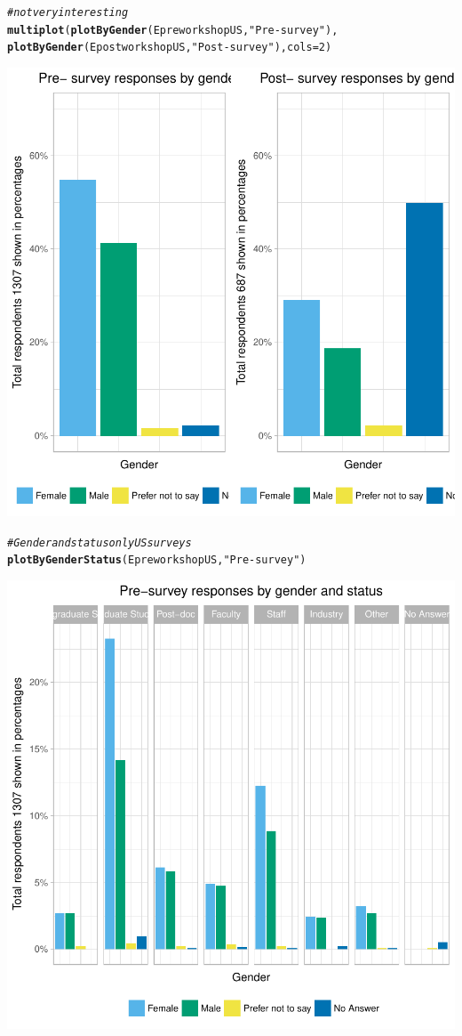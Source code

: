 \documentclass{article}\usepackage[]{graphicx}\usepackage[]{color}
\makeatletter
\newcommand{\hlnum}[1]{\textcolor[rgb]{0.686,0.059,0.569}{#1}}%
\newcommand{\hlstr}[1]{\textcolor[rgb]{0.192,0.494,0.8}{#1}}%
\newcommand{\hlcom}[1]{\textcolor[rgb]{0.678,0.584,0.686}{\textit{#1}}}%
\newcommand{\hlstd}[1]{\textcolor[rgb]{0.345,0.345,0.345}{#1}}%
\newcommand{\hlkwc}[1]{\textcolor[rgb]{0.333,0.667,0.333}{#1}}%
\newcommand{\hlkwd}[1]{\textcolor[rgb]{0.737,0.353,0.396}{\textbf{#1}}}%
\newenvironment{kframe}{%
 \def\at@end@of@kframe{}%
 \ifinner\ifhmode%
  \def\at@end@of@kframe{\end{minipage}}%
  \begin{minipage}{\columnwidth}%
 \fi\fi%
 \def\FrameCommand##1{\hskip\@totalleftmargin \hskip-\fboxsep
 \colorbox{shadecolor}{##1}\hskip-\fboxsep
     \hskip-\linewidth \hskip-\@totalleftmargin \hskip\columnwidth}%
 \MakeFramed {\advance\hsize-\width
   \@totalleftmargin\z@ \linewidth\hsize
   \@setminipage}}%
 {\par\unskip\endMakeFramed%
 \at@end@of@kframe}
\newenvironment{knitrout}{}{} %
\makeatother
\begin{document}
\begin{knitrout}
\color{fgcolor}\begin{kframe}
\begin{alltt}
\hlcom{# not very interesting}
\hlkwd{multiplot}\hlstd{(}\hlkwd{plotByGender}\hlstd{(EpreworkshopUS,} \hlstr{"Pre- survey"}\hlstd{),}
          \hlkwd{plotByGender}\hlstd{(EpostworkshopUS,} \hlstr{"Post- survey"}\hlstd{),} \hlkwc{cols}\hlstd{=}\hlnum{2}\hlstd{)}
\end{alltt}
\end{kframe}

{\centering \includegraphics[width=.6\linewidth]{figure/calls-Rnwplotting-pre-postsurvey-dataUS-1} 

}


\begin{kframe}\begin{alltt}
\hlcom{# Gender and status only US surveys}
\hlkwd{plotByGenderStatus}\hlstd{(EpreworkshopUS,} \hlstr{"Pre-survey"}\hlstd{)}
\end{alltt}
\end{kframe}

{\centering \includegraphics[width=.6\linewidth]{figure/calls-Rnwplotting-pre-postsurvey-dataUS-2} 

}
\end{knitrout}
\end{document}

